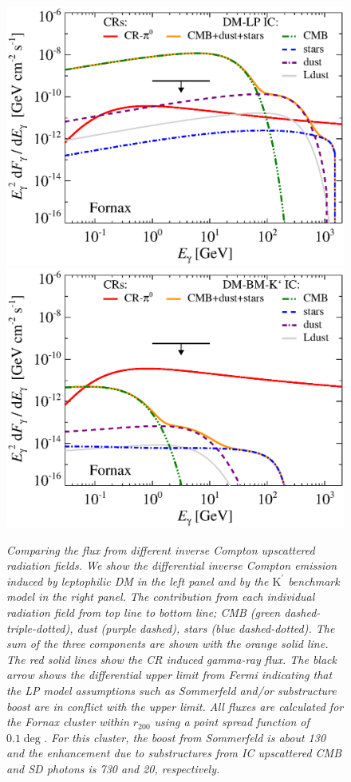 \documentclass[10pt,aps,pra,reprint,amsmath,amsfonts,amssymb,showpacs,nofootinbib,floatfix]{revtex4-1}
\def\del#1{{}}
\newcommand{\rmn}{\mathrm}
\newcommand{\Kp}{\rmn{K}^\prime}
\newcommand{\rvir}{r_{200}}
\begin{document}
\begin{figure}
\begin{minipage}{2.0\columnwidth}
\includegraphics[width=0.49\columnwidth]{figures/flux.IRcomp.v12.0.1deg.1.6T.SubMass.elmu.SF300.noMW.woGal.eps}
\includegraphics[width=0.49\columnwidth]{figures/flux.IRcomp.BMv12.0.1deg.SubMass.noMW.woGal.eps}
\caption{\it Comparing the flux from different inverse Compton
  upscattered radiation fields. We show the differential inverse
  Compton emission induced by leptophilic DM in the left panel and by
  the $\Kp$ benchmark model in the right panel. The contribution from
  each individual radiation field from top line to bottom line; CMB
  (green dashed-triple-dotted), dust (purple dashed), stars (blue
  dashed-dotted). The sum of the three components are shown with the
  orange solid line.  The red solid lines show the CR induced gamma-ray
  flux. The black arrow shows the differential upper limit from Fermi
  \protect \cite{2010ApJ...717L..71A} indicating that the LP model
  assumptions such as Sommerfeld and/or substructure boost are in
  conflict with the upper limit. \del{We also show projected CTA point
  source sensitivities ($5\sigma$, 50h).}  All fluxes are calculated
  for the Fornax cluster within $\rvir$ using a point spread function
  of $0.1\deg$. For this cluster, the boost from Sommerfeld is about
  130 and the enhancement due to substructures from IC upscattered CMB
  and SD photons is 730 and 20, respectively.}
 \label{fig:IR_comp}
\end{minipage}
\end{figure}
\end{document}
